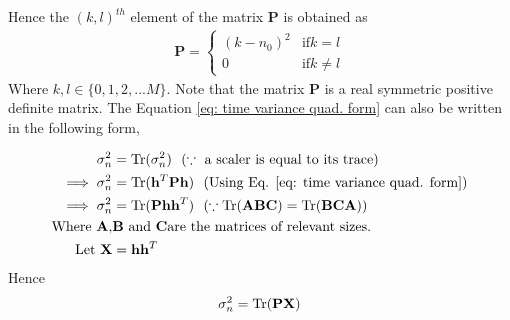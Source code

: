 Hence the $(k,l)^{th}$ element of the matrix $\mathbf{P}$ is obtained as
\begin{eqnarray}
\mathbf{P} = \begin{cases}
(k-n_0)^2 & \text{if} k = l\\
0         & \text{if} k\neq l
\end{cases}
\end{eqnarray}
Where ${k,l} \in \{0,1,2,...M \}$. Note that the matrix $\mathbf{P}$ is a real symmetric positive definite matrix.
The Equation \ref{eq: time variance quad. form} can also be written in the following form,

\begin{eqnarray*}
\begin{aligned}
\sigma_n^2 &= \trace(\sigma_n^2) \, \, \,\, (\because \text{ a scaler is equal to its trace)} %
\\ \implies \sigma_n^2 &= \trace(\mathbf{h}^T\mathbf{Ph})\,\,\,\, (\text{Using Eq. \ref{eq: time variance quad. form}}) 
\\	 \implies \sigma_n^2  &= \trace(\mathbf{Ph}\mathbf{h}^T)\,\,\,\, (\because \trace(\mathbf{ABC})=\trace(\mathbf{BCA})) %
\\ \text{Where}\,\, \mathbf{A},&\mathbf{B}\,\, \text{and} \,\, \mathbf{C} \text{are the matrices of relevant sizes.}
\\ \text{Let}\,\, \mathbf{X} &= \mathbf{h}{\mathbf{h}^T}
\end{aligned}
\end{eqnarray*}
Hence 
\begin{eqnarray}
\label{eq: time variance in trace form}
\sigma_n^2 = \operatorname{Tr}(\mathbf{PX})
\end{eqnarray}

